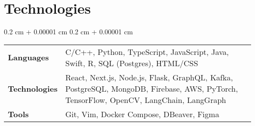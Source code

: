 \documentclass[10pt, letterpaper]{article}
\newenvironment{onecolentry}{
    \begin{adjustwidth}{
        0.2 cm + 0.00001 cm
    }{
        0.2 cm + 0.00001 cm
    }
}{
    \end{adjustwidth}
} %
\begin{document}
    \section{Technologies}
    
        \begin{onecolentry}
            \begin{tabularx}{\textwidth}{@{}p{2.15cm}Y@{}}
                \textbf{Languages} & C/C++, Python, TypeScript, JavaScript, Java, Swift, R, SQL (Postgres), HTML/CSS \\[0.1cm]
                \textbf{Technologies} & React, Next.js, Node.js, Flask, GraphQL, Kafka, PostgreSQL, MongoDB, Firebase, AWS, PyTorch, TensorFlow, OpenCV, LangChain, LangGraph \\[0.5cm]
                \textbf{Tools} & Git, Vim, Docker Compose, DBeaver, Figma
            \end{tabularx}
        \end{onecolentry}
\end{document}
